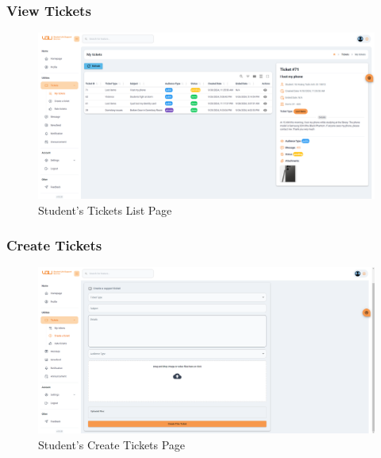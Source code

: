 	\subsubsection{View Tickets}
	\begin{figure}[H]
		\centering
		\includegraphics[width=1.0\linewidth]{graphics/gui/student/my-tickets}
		\caption{Student's Tickets List Page}
		\label{fig:gui-std-my-tickets}
	\end{figure}
	
	
	\subsubsection{Create Tickets}
	\begin{figure}[H]
		\centering
		\includegraphics[width=1.0\linewidth]{graphics/gui/student/create-ticket}
		\caption{Student's Create Tickets Page}
		\label{fig:gui-std-create-ticket}
	\end{figure}
	
	

